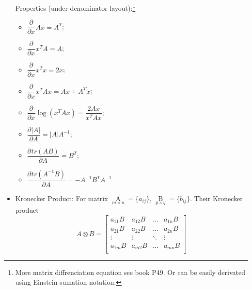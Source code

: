 \begin{itemize}[topsep=6pt,itemsep=4pt]
        \hypertarget{MatrixDifferenciation}{Properties (under denominator-layout):}\footnote{More matrix diffrenciation equation see book \cite{线性回归分析ref2} P49. Or can be easily derivated using Einstein sumation notation.}
        \begin{itemize}[topsep=6pt,itemsep=2pt]
            \item $ \dfrac{\partial^{} }{\partial x^{}}Ax=A^T $;\\
            \item $ \dfrac{\partial^{} }{\partial x^{}}x^TA=A $;\\
            \item $ \dfrac{\partial^{} }{\partial x^{}}x^Tx=2x $;\\
            \item $ \dfrac{\partial^{} }{\partial x^{}}x^TAx=Ax+A^Tx $;\\
            \item $ \dfrac{\partial^{} }{\partial x^{}}\log(x^TAx)=\dfrac{2Ax}{x^TAx} $;\\
            \item $ \dfrac{\partial^{} |A|}{\partial A^{}}=|A|A^{-1} $;\\
            \item $ \dfrac{\partial^{} tr(AB)}{\partial A^{}}=B^T $;\\
            \item $ \dfrac{\partial^{} tr(A^{-1}B)}{\partial A^{}}=-A^{-1}B^TA^{-1} $
        \end{itemize}
          
        
        \item Kronecker Product: For matrix $ \mathop{A}\limits_{m\times n}=\{a_{ij}\},\,\mathop{B}\limits_{p\times q}=\{b_{ij}\} $. Their Kronecker product
        \begin{equation}
            A\otimes B=\begin{bmatrix}
            a_{11}B&a_{12}B&\ldots&a_{1n}B \\
            a_{21}B&a_{22}B&\ldots&a_{2n}B \\
            \vdots&\vdots&\ddots&\vdots\\
            a_{1m}B&a_{m2}B&\ldots&a_{mn}B \\
            \end{bmatrix} 
        \end{equation}


\end{itemize}
